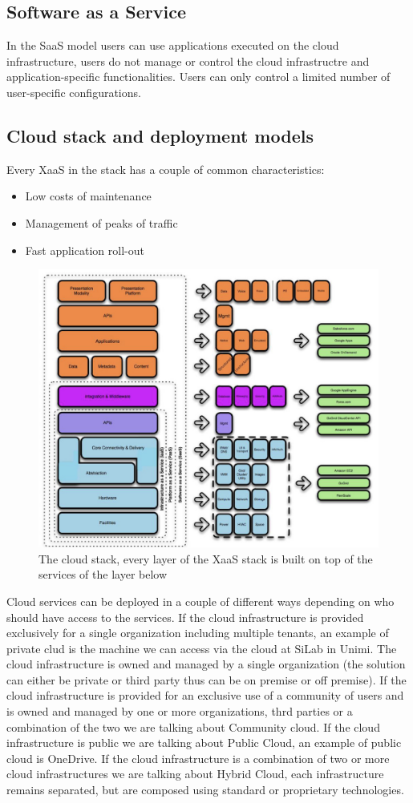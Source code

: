\subsection{Software as a Service}
In the SaaS model users can use applications executed on the cloud infrastructure, users do not manage or control the cloud infrastructre and application-specific functionalities. Users can only control a limited number of user-specific configurations.
\subsection{Cloud stack and deployment models}
Every XaaS in the stack has a couple of common characteristics:
\begin{itemize}
    \item Low costs of maintenance
    \item Management of peaks of traffic
    \item Fast application roll-out
\end{itemize}
\begin{figure}
    \centering
    \includegraphics[scale=0.2]{./Images/cloud_stack.jpeg}
    \caption{The cloud stack, every layer of the XaaS stack is built on top of the services of the layer below}
\end{figure}
Cloud services can be deployed in a couple of different ways depending on who should have access to the services. \n
If the cloud infrastructure is provided exclusively for a single organization including multiple tenants, an example of private clud is the machine we can access via the cloud at SiLab in Unimi. The cloud infrastructure is owned and managed by a single organization (the solution can either be private or third party thus can be on premise or off premise). \n
If the cloud infrastructure is provided for an exclusive use of a community of users and is owned and managed by one or more organizations, thrd parties or a combination of the two we are talking about Community cloud. \n
If the cloud infrastructure is public we are talking about Public Cloud, an example of public cloud is OneDrive. \n
If the cloud infrastructure is a combination of two or more cloud infrastructures we are talking about Hybrid Cloud, each infrastructure remains separated, but are composed using standard or proprietary technologies. \n